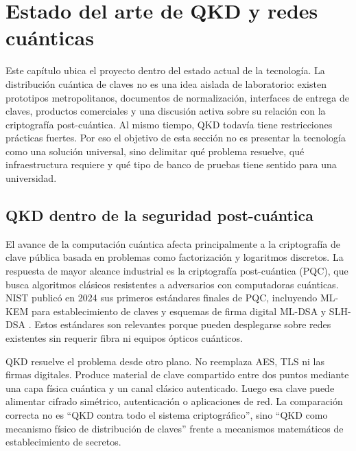 \chapter{Estado del arte de QKD y redes cuánticas}
\label{chap:estado_arte}

Este capítulo ubica el proyecto dentro del estado actual de la tecnología. La distribución cuántica de claves no es una idea aislada de laboratorio: existen prototipos metropolitanos, documentos de normalización, interfaces de entrega de claves, productos comerciales y una discusión activa sobre su relación con la criptografía post-cuántica. Al mismo tiempo, QKD todavía tiene restricciones prácticas fuertes. Por eso el objetivo de esta sección no es presentar la tecnología como una solución universal, sino delimitar qué problema resuelve, qué infraestructura requiere y qué tipo de banco de pruebas tiene sentido para una universidad.

\section{QKD dentro de la seguridad post-cuántica}

El avance de la computación cuántica afecta principalmente a la criptografía de clave pública basada en problemas como factorización y logaritmos discretos. La respuesta de mayor alcance industrial es la criptografía post-cuántica (PQC), que busca algoritmos clásicos resistentes a adversarios con computadoras cuánticas. NIST publicó en 2024 sus primeros estándares finales de PQC, incluyendo ML-KEM para establecimiento de claves y esquemas de firma digital ML-DSA y SLH-DSA \cite{nistPQC2024}. Estos estándares son relevantes porque pueden desplegarse sobre redes existentes sin requerir fibra ni equipos ópticos cuánticos.

QKD resuelve el problema desde otro plano. No reemplaza AES, TLS ni las firmas digitales. Produce material de clave compartido entre dos puntos mediante una capa física cuántica y un canal clásico autenticado. Luego esa clave puede alimentar cifrado simétrico, autenticación o aplicaciones de red. La comparación correcta no es ``QKD contra todo el sistema criptográfico'', sino ``QKD como mecanismo físico de distribución de claves'' frente a mecanismos matemáticos de establecimiento de secretos.

